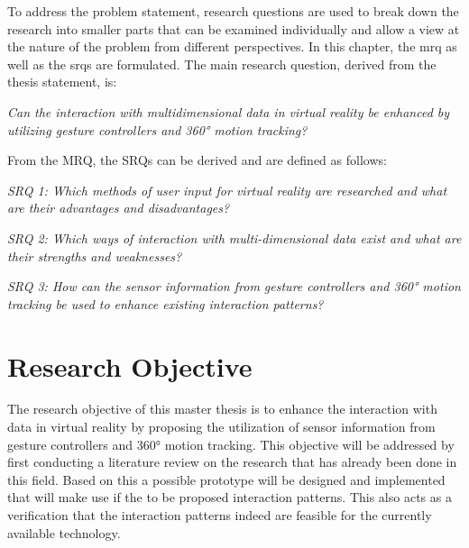 To address the problem statement, research questions are used to break down the research into smaller parts that can be examined individually and allow a view at the nature of the problem from different perspectives.
In this chapter, the \gls{mrq} as well as the \glspl{srq} are formulated. \newline
The main research question, derived from the thesis statement, is:
\begin{framed}
	\textit{Can the interaction with multidimensional data in virtual reality be enhanced by utilizing gesture controllers and 360° motion tracking?}
\end{framed} \label{MRQ}
From the MRQ, the SRQs can be derived and are defined as follows:
\begin{framed}
	\textit{SRQ 1: Which methods of user input for virtual reality are researched and what are their advantages and disadvantages?}
\end{framed} \label{SRQ1}
\begin{framed}
	\textit{SRQ 2: Which ways of interaction with multi-dimensional data exist and what are their strengths and weaknesses?}
\end{framed} \label{SRQ2}
\begin{framed}
	\textit{SRQ 3: How can the sensor information from gesture controllers and 360° motion tracking be used to enhance existing interaction patterns?}
\end{framed} \label{SRQ3}
 


\section{Research Objective}

The research objective of this master thesis is to enhance the interaction with data in virtual reality by proposing the utilization of sensor information from gesture controllers and 360° motion tracking.\newline
This objective will be addressed by first conducting a literature review on the research that has already been done in this field. Based on this a possible prototype will be designed and implemented that will make use if the to be proposed interaction patterns. This also acts as a verification that the interaction patterns indeed are feasible for the currently available technology.


